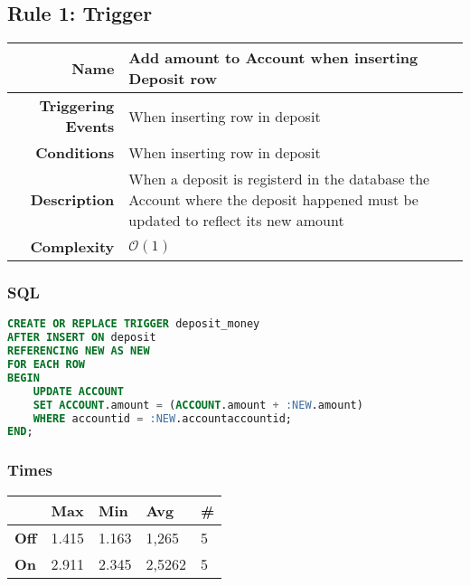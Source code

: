 \documentclass[a4paper, 10pt]{article}
\begin{document}
\begin{minipage}\linewidth

\subsection{Rule 1: Trigger}

\begin{table}[H]
\begin{tabularx}{\linewidth}{| r | X |}
\hline
\textbf{Name}              & Add amount to Account when inserting Deposit row \\ \hline
\textbf{Triggering Events} & When inserting row in deposit \\ \hline
\textbf{Conditions}        & When inserting row in deposit \\ \hline
\textbf{Description}       & When a deposit is registerd in the database the Account where the deposit happened must be updated to reflect its new amount\\ \hline
\textbf{Complexity}        & $\mathcal{O}(1)$  \\ \hline
\end{tabularx}
\end{table}

\subsubsection{SQL}
\begin{lstlisting}[language=SQL]
CREATE OR REPLACE TRIGGER deposit_money
AFTER INSERT ON deposit
REFERENCING NEW AS NEW
FOR EACH ROW
BEGIN
    UPDATE ACCOUNT
    SET ACCOUNT.amount = (ACCOUNT.amount + :NEW.amount)
    WHERE accountid = :NEW.accountaccountid;
END;
\end{lstlisting}

\subsubsection{Times}
\begin{table}[H]
\begin{tabular}{l|l|l|l|l|}
\cline{2-5}
\textbf{}                             & \textbf{Max} & \textbf{Min} & \textbf{Avg} & \textbf{\#}  \\ \hline
\multicolumn{1}{|l|}{\textbf{Off}} & 1.415         & 1.163         & 1,265          & 5            \\ \hline
\multicolumn{1}{|l|}{\textbf{On}}  & 2.911         &  2.345         & 2,5262          & 5            \\ \hline
\end{tabular}
\end{table}
\end{minipage}
\end{document}
